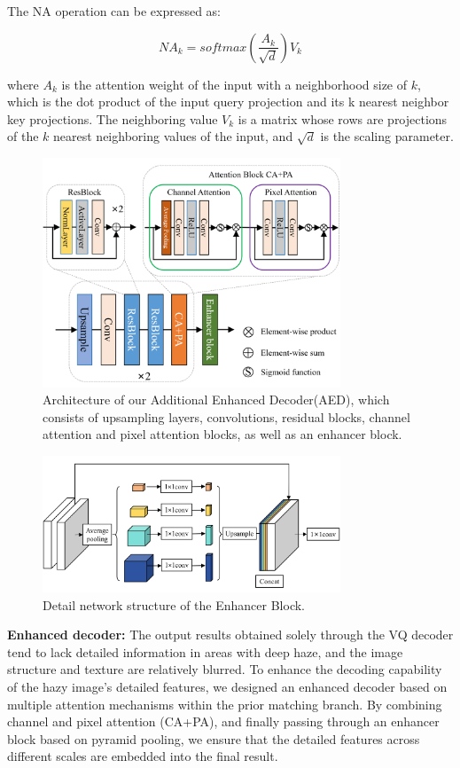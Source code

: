 \documentclass[lettersize,journal]{IEEEtran}
\begin{document}
The NA operation can be expressed as:

\begin{equation}
	\label{NA_operation}
	NA_{k} = softmax (\frac{A_{k}}{\sqrt{d}}) V_{k}
\end{equation}

where $A_{k}$ is the attention weight of the input with a neighborhood size of $k$, which is the dot product of the input query projection and its k nearest neighbor key projections. The neighboring value $V_k$ is a matrix whose rows are projections of the $k$ nearest neighboring values of the input, and $\sqrt{d}$ is the scaling parameter.

\begin{figure}[!t]
	\centering
	\includegraphics[width=3.5in]{enhanced_decoder}
	\caption{Architecture of our Additional Enhanced Decoder(AED), which consists of upsampling layers, convolutions, residual blocks, channel attention and pixel attention blocks, as well as an enhancer block. }
	\label{fig3}
\end{figure}
\begin{figure}[!t]
	\centering
	\includegraphics[width=3.5in]{enhancer_block}
	\caption{Detail network structure of the Enhancer Block.}
	\label{fig4}
\end{figure}

{\bf{Enhanced decoder:}}
The output results obtained solely through the VQ decoder tend to lack detailed information in areas with deep haze, and the image structure and texture are relatively blurred. To enhance the decoding capability of the hazy image's detailed features, we designed an enhanced decoder based on multiple attention mechanisms within the prior matching branch. By combining channel and pixel attention (CA+PA)\cite{qin2020ffa}, and finally passing through an enhancer block\cite{qu2019enhanced} based on pyramid pooling, we ensure that the detailed features across different scales are embedded into the final result.
\end{document}
